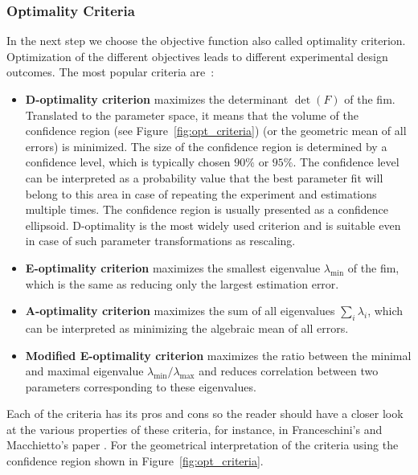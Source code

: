 \documentclass[10pt,A4paper]{article}
\begin{document}
\subsubsection*{Optimality Criteria}
In the next step we choose the objective function also called optimality criterion.
Optimization of the different objectives leads to different experimental design outcomes.
The most popular criteria are~\cite{balsa-cantoe.bangaj.r.COMPUTINGOPTIMALDYNAMIC2008, dette_designing_1997, walter_qualitative_1990}:
\begin{itemize}
\item \textbf{D-optimality criterion} maximizes the determinant $\det (F)$ of the \ac{fim}.
 Translated to the parameter space, it means that the volume of the confidence region (see Figure~\ref{fig:opt_criteria}) (or the geometric mean of all errors) is minimized.
 The size of the confidence region is determined by a confidence level, which is typically chosen $90 \%$ or $95 \%$.
 The confidence level can be interpreted as a probability value that the best
 parameter fit will belong to this area in case of repeating the experiment and estimations multiple times.
 The confidence region is usually presented as a confidence ellipsoid.
 D-optimality is the most widely used criterion and is suitable even in case of such parameter transformations as rescaling.
\item \textbf{E-optimality criterion} maximizes the smallest eigenvalue $\lambda_{\min}$ of the \ac{fim}, which is the same as reducing only the largest estimation error.
\item \textbf{A-optimality criterion} maximizes the sum of all eigenvalues $\sum_i \lambda_i$, which can be interpreted as minimizing the algebraic mean of all errors.
\item \textbf{Modified E-optimality criterion} maximizes the ratio between the minimal and maximal eigenvalue $\lambda_{\min} / \lambda_{\max}$ and reduces correlation between two parameters corresponding to these eigenvalues.

\end{itemize}
Each of the criteria has its pros and cons so the reader should have a closer look at the various properties of these criteria, for instance, in Franceschini's and Macchietto's paper \cite{franceschiniModelbasedDesignExperiments2008}.
For the geometrical interpretation of the criteria using the confidence region shown in Figure~\ref{fig:opt_criteria}.
\end{document}
